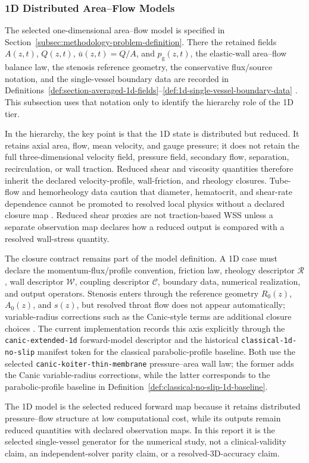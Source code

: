 \subsubsection{1D Distributed Area--Flow Models}
\label{subsubsec:1d-models}

The selected one-dimensional area--flow model is specified in
Section~\ref{subsec:methodology-problem-definition}. There the retained fields
$A(z,t)$, $Q(z,t)$, $\bar u(z,t)=Q/A$, and $p_{\mathrm g}(z,t)$, the
elastic-wall area--flow balance law, the stenosis reference geometry, the
conservative flux/source notation, and the single-vessel boundary data are
recorded in
Definitions~\ref{def:section-averaged-1d-fields}--\ref{def:1d-single-vessel-boundary-data}
\cite{FormaggiaEtAl2003OneDimensionalBloodFlow,KopplHelmig2023DimensionReducedModeling}.
This subsection uses that notation only to identify the hierarchy role of the
1D tier.

In the hierarchy, the key point is that the 1D state is distributed but reduced.
It retains axial area, flow, mean velocity, and gauge pressure; it does not
retain the full three-dimensional velocity field, pressure field, secondary
flow, separation, recirculation, or wall traction. Reduced shear and viscosity
quantities therefore inherit the declared velocity-profile, wall-friction, and
rheology closures. Tube-flow and hemorheology data caution that diameter,
hematocrit, and shear-rate dependence cannot be promoted to resolved local
physics without a declared closure map
\cite{PriesEtAl1992BloodViscosityTubeFlow,GaldiEtAl2008HemodynamicalFlows}.
Reduced shear proxies are not traction-based WSS unless a separate observation
map declares how a reduced output is compared with a resolved wall-stress
quantity.

The closure contract remains part of the model definition. A 1D case must
declare the momentum-flux/profile convention, friction law, rheology descriptor
$\mathcal R$, wall descriptor $\mathcal W$, coupling descriptor $\mathcal C$,
boundary data, numerical realization, and output operators. Stenosis enters
through the reference geometry $R_0(z)$, $A_0(z)$, and $s(z)$, but resolved
throat flow does not appear automatically; variable-radius corrections such as
the Canic-style terms are additional closure choices
\cite{CanicEtAl2024Extended1DStenosis}.
The current implementation records this axis explicitly through the
\texttt{canic-extended-1d} forward-model descriptor and the historical
\texttt{classical-1d-no-slip} manifest token for the classical
parabolic-profile baseline. Both use the selected
\texttt{canic-koiter-thin-membrane} pressure--area wall law; the former adds
the Canic variable-radius corrections, while the latter corresponds to the
parabolic-profile baseline in
Definition~\ref{def:classical-no-slip-1d-baseline}.

The 1D model is the selected reduced forward map because it retains distributed
pressure--flow structure at low computational cost, while its outputs remain
reduced quantities with declared observation maps. In this report it is the
selected single-vessel generator for the numerical study, not a
clinical-validity claim, an independent-solver parity claim, or a
resolved-3D-accuracy claim.
